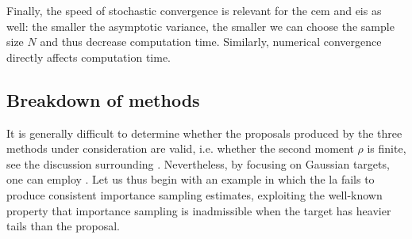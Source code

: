 Finally, the speed of stochastic convergence is relevant for the \gls{cem} and \gls{eis} as well: the smaller the asymptotic variance, the smaller we can choose the sample size $N$ and thus decrease computation time. 
Similarly, numerical convergence directly affects computation time. 


\subsection{Breakdown of methods}

It is generally difficult to determine whether the proposals produced by the three methods under consideration are valid, i.e. whether the second moment $\rho$ is finite, see the discussion surrounding . Nevertheless, by focusing on Gaussian targets, one can employ . Let us thus begin with an example in which the \gls{la} fails to produce consistent importance sampling estimates, exploiting the well-known property that importance sampling is inadmissible when the target has heavier tails than the proposal.
